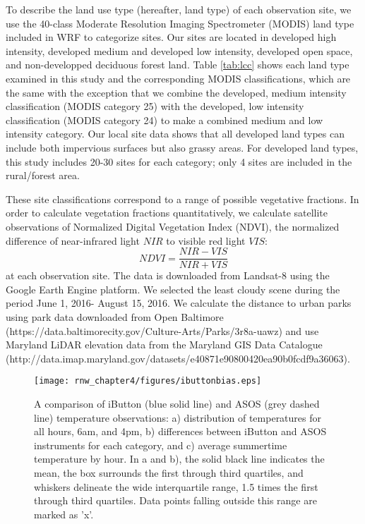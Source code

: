  To describe the land use type (hereafter, land type) of each observation site, we use the 40-class Moderate Resolution Imaging Spectrometer (MODIS) land type included in WRF to categorize sites. Our sites are located in developed high intensity, developed medium and developed low intensity, developed open space, and non-developped deciduous forest land.
 Table \ref{tab:lcc} shows each land type examined in this study and the corresponding MODIS classifications, which are the same with the exception that we combine the developed, medium intensity classification (MODIS category 25) with the developed, low intensity classification (MODIS category 24) to make a combined medium and low intensity category. Our local site data shows that all developed land types can include both impervious surfaces but also grassy areas. 
For developed land types, this study includes 20-30 sites for each category; only 4 sites are included in the rural/forest area. 

These site classifications correspond to a range of possible vegetative fractions. In order to calculate vegetation fractions quantitatively, we calculate satellite observations of Normalized Digital Vegetation Index (NDVI), the normalized difference of near-infrared light $NIR$ to visible red light $VIS$: 
\[NDVI = \frac{NIR-VIS}{NIR+VIS}\]
at each observation site. The data is downloaded from Landsat-8 using the Google Earth Engine platform. We selected the least cloudy scene during the period June 1, 2016- August 15, 2016.  
We calculate the distance to urban parks using park data downloaded from Open Baltimore (https://data.baltimorecity.gov/Culture-Arts/Parks/3r8a-uawz) and use Maryland LiDAR elevation data from the Maryland GIS Data Catalogue 
(http://data.imap.maryland.gov/datasets/e40871e90800420ea90b0fcdf9a36063). 

\begin{figure}
\centering
\texttt{[image: rnw\_chapter4/figures/ibuttonbias.eps]}
\caption{A comparison of iButton (blue solid line) and ASOS (grey dashed line) temperature observations: a) distribution of temperatures for all hours,  6am, and 4pm, b) differences between iButton and ASOS instruments for each category, and c) average summertime temperature by hour. In a and b), the solid black line indicates the mean, the box surrounds the first through third quartiles, and whiskers delineate the wide interquartile range, 1.5 times the first through third quartiles. Data points falling outside this range are marked as 'x'. }
\label{fig:bias}
\end{figure}

